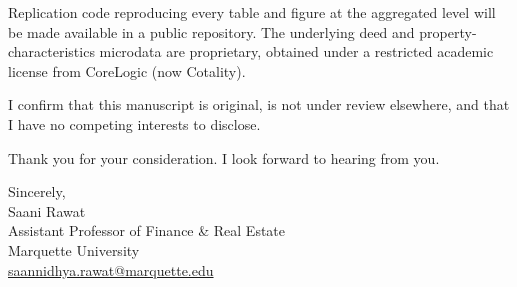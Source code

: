 \documentclass[12pt]{article}
\begin{document}
Replication code reproducing every table and figure at the aggregated level will be made available in a public repository. 
The underlying deed and property-characteristics microdata are proprietary, obtained under a restricted academic license from CoreLogic (now Cotality).

I confirm that this manuscript is original, is not under review elsewhere, and that I have no competing interests to disclose.

Thank you for your consideration. I look forward to hearing from you.

Sincerely,\\[1ex]
Saani Rawat\\
Assistant Professor of Finance \& Real Estate\\
Marquette University\\
\href{mailto:saannidhya.rawat@marquette.edu}{saannidhya.rawat@marquette.edu}
\end{document}
